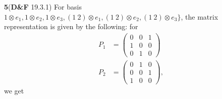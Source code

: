 \documentclass[a4paper, 12pt]{article}
\theoremstyle{Mydefinition}
\theoremstyle{Mytheorem}
\begin{document}
\noindent \textbf{5}(\textbf{D\&F} 19.3.1)
For basis $1\otimes e_1, 1\otimes e_2, 1\otimes e_3, (1~2)\otimes e_1, (1~2)\otimes e_2, (1~2)\otimes e_3\}$, the matrix representation is given by the following: for
\begin{equation}
    \begin{split}
        P_1 &= \begin{pmatrix}
        0 & 0 & 1\\
        1 & 0 & 0\\
        0 & 1 & 0
        \end{pmatrix}\\
        P_2 &= \begin{pmatrix}
        0 & 1 & 0\\
        0 & 0 & 1\\
        1 & 0 & 0
        \end{pmatrix},
    \end{split}
\end{equation}
we get
\end{document}
